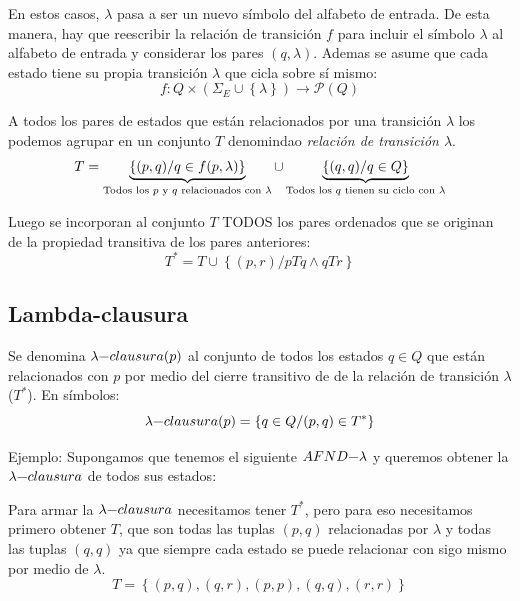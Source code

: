 \documentclass[12pt]{article}
\begin{document}
En estos casos, $ \lambda $ pasa a ser un nuevo símbolo del alfabeto de entrada. De esta manera, hay que reescribir la relación de transición $ f $ para incluir el símbolo $ \lambda $ al alfabeto de entrada y considerar los pares $ (q,\lambda) $. Ademas se asume que cada estado tiene su propia transición $ \lambda $ que cicla sobre sí mismo:
\[
f:Q\times (\Sigma_{E} \cup \left\{\lambda\right\}) \to \mathcal{P}(Q)
\]

A todos los pares de estados que están relacionados por una transición $ \lambda $ los podemos agrupar en un conjunto $ T $ denomindao \textit{relación de transición $ \lambda $}.
\[
T=\underbrace{\left\{(p,q) / q \in f(p,\lambda)\right\}}_{\text{Todos los $ p $ y $ q $ relacionados con $ \lambda $}} \cup \underbrace{\left\{(q,q) / q \in Q\right\}}_{\text{Todos los $ q $ tienen su ciclo con $ \lambda $}}
\]

Luego se incorporan al conjunto $ T $ TODOS los pares ordenados que se originan de la propiedad transitiva de los pares anteriores:
\[
T^{*} = T \cup \left\{(p,r) / pTq \land qTr\right\}
\]

\subsection{Lambda-clausura}
Se denomina $ \lambda \text{{\textminus}}clausura(p)$ al conjunto de todos los estados $ q \in Q $ que están relacionados con $ p $ por medio del cierre transitivo de de la relación de transición $ \lambda $ ($ T^{*} $). En símbolos:
\[
	\lambda \text{{\textminus}} clausura(p) = \left\{q \in Q / (p,q) \in T^{*}\right\}
\]

Ejemplo: Supongamos que tenemos el siguiente $ AFND\text{{\textminus}}\lambda $ y queremos obtener la $ \lambda\text{{\textminus}}clausura $ de todos sus estados:
\begin{center}
\end{center}

Para armar la $ \lambda\text{{\textminus}}clausura $ necesitamos tener $ T^{*} $, pero para eso necesitamos primero obtener $ T $, que son todas las tuplas $ (p,q) $ relacionadas por $ \lambda $ y todas las tuplas $ (q,q) $ ya que siempre cada estado se puede relacionar con sigo mismo por medio de $ \lambda $.
\[
T=\left\{(p,q),(q,r),(p,p),(q,q),(r,r)\right\}
\]
\end{document}
